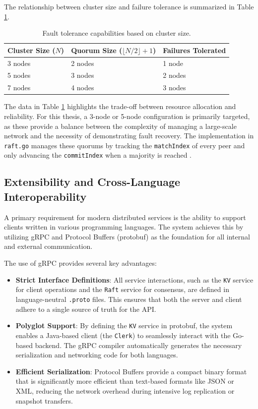 The relationship between cluster size and failure tolerance is summarized in Table \ref{tab:fault_tolerance}.

\begin{table}[h]
\centering
\caption{Fault tolerance capabilities based on cluster size.}
\label{tab:fault_tolerance}
\begin{tabular}{|l|l|l|}
\hline
\textbf{Cluster Size ($N$)} & \textbf{Quorum Size ($\lfloor N/2 \rfloor + 1$)} & \textbf{Failures Tolerated} \\ \hline
3 nodes & 2 nodes & 1 node \\ \hline
5 nodes & 3 nodes & 2 nodes \\ \hline
7 nodes & 4 nodes & 3 nodes \\ \hline
\end{tabular}
\end{table}

The data in Table \ref{tab:fault_tolerance} highlights the trade-off between resource allocation and reliability. For this thesis, a 3-node or 5-node configuration is primarily targeted, as these provide a balance between the complexity of managing a large-scale network and the necessity of demonstrating fault recovery. The implementation in \texttt{raft.go} manages these quorums by tracking the \texttt{matchIndex} of every peer and only advancing the \texttt{commitIndex} when a majority is reached \cite{2}.

\subsection{Extensibility and Cross-Language Interoperability}
A primary requirement for modern distributed services is the ability to support clients written in various programming languages. The system achieves this by utilizing gRPC and Protocol Buffers (protobuf) as the foundation for all internal and external communication.

The use of gRPC provides several key advantages:
\begin{itemize}
    \item \textbf{Strict Interface Definitions}: All service interactions, such as the \texttt{KV} service for client operations and the \texttt{Raft} service for consensus, are defined in language-neutral \texttt{.proto} files. This ensures that both the server and client adhere to a single source of truth for the API.
    \item \textbf{Polyglot Support}: By defining the \texttt{KV} service in protobuf, the system enables a Java-based client (the \texttt{Clerk}) to seamlessly interact with the Go-based backend. The gRPC compiler automatically generates the necessary serialization and networking code for both languages.
    \item \textbf{Efficient Serialization}: Protocol Buffers provide a compact binary format that is significantly more efficient than text-based formats like JSON or XML, reducing the network overhead during intensive log replication or snapshot transfers.
\end{itemize}

